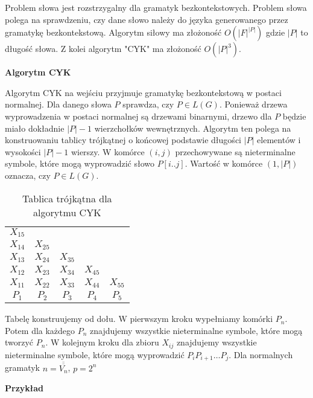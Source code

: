 \documentclass{../notatki}
\begin{document}
Problem słowa jest rozstrzygalny dla gramatyk bezkontekstowych.
Problem słowa polega na sprawdzeniu, czy dane słowo należy do języka
generowanego przez gramatykę bezkontekstową.
Algorytm siłowy ma złożoność $O(|F|^{|P|})$ gdzie $|P|$ to
długość słowa. Z kolei algorytm "CYK" ma złożoność $O(|P|^3)$.

\noindent \textbf{Algorytm CYK}

Algorytm CYK na wejściu przyjmuje gramatykę bezkontekstową w postaci
normalnej. Dla danego słowa $P$ sprawdza, czy $P \in L(G)$. Ponieważ drzewa
wyprowadzenia w postaci normalnej są drzewami binarnymi, drzewo dla $P$ będzie
miało dokładnie $|P| - 1$ wierzchołków wewnętrznych. Algorytm ten polega na
konstruowaniu tablicy trójkątnej o końcowej podstawie długości $|P|$ elementów
i wysokości $|P| - 1$ wierszy. W komórce $(i, j)$ przechowywane są nieterminalne
symbole, które mogą wyprowadzić słowo $P[i..j]$. Wartość w komórce $(1, |P|)$
oznacza, czy $P \in L(G)$.

\begin{table*}[h]
  \centering
  \begin{tabular}{|ccccc}
    $X_{15}$ & & & & \\
    $X_{14}$ & $X_{25}$ & & & \\
    $X_{13}$ & $X_{24}$ & $X_{35}$ & & \\
    $X_{12}$ & $X_{23}$ & $X_{34}$ & $X_{45}$ & \\
    $X_{11}$ & $X_{22}$ & $X_{33}$ & $X_{44}$ & $X_{55}$ \\
    \hline
    $P_1$ & $P_2$ & $P_3$ & $P_4$ & $P_5$
  \end{tabular}
  \caption{Tablica trójkątna dla algorytmu CYK}
\end{table*}

Tabelę konstruujemy od dołu. W pierwszym kroku wypełniamy komórki $P_n$. Potem
dla każdego $P_n$ znajdujemy wszystkie nieterminalne symbole, które mogą
tworzyć $P_n$. W kolejnym kroku dla zbioru $X_{ij}$ znajdujemy wszystkie
nieterminalne symbole, które mogą wyprowadzić $P_iP_{i+1}\dots P_j$.
Dla normalnych gramatyk $n = \overline{\overline{V_n}}$, $p=2^n$

\noindent \textbf{Przykład}
\end{document}
